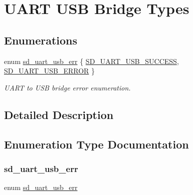 \hypertarget{group___s_d___u_a_r_t___u_s_b___bridge___types}{}\section{U\+A\+RT U\+SB Bridge Types}
\label{group___s_d___u_a_r_t___u_s_b___bridge___types}
\subsection*{Enumerations}
\begin{DoxyCompactItemize}
\item 
enum \mbox{\hyperlink{group___s_d___u_a_r_t___u_s_b___bridge___types_ga7e4773a8cce69fafe541cad55985f146}{sd\+\_\+uart\+\_\+usb\+\_\+err}} \{ \mbox{\hyperlink{group___s_d___u_a_r_t___u_s_b___bridge___types_gga7e4773a8cce69fafe541cad55985f146a5f1ee74f25f6a6f1aa6b771dc91abe11}{S\+D\+\_\+\+U\+A\+R\+T\+\_\+\+U\+S\+B\+\_\+\+S\+U\+C\+C\+E\+SS}}, 
\mbox{\hyperlink{group___s_d___u_a_r_t___u_s_b___bridge___types_gga7e4773a8cce69fafe541cad55985f146a5180e03b0462c07dd08871357b0030e5}{S\+D\+\_\+\+U\+A\+R\+T\+\_\+\+U\+S\+B\+\_\+\+E\+R\+R\+OR}}
 \}
\begin{DoxyCompactList}\small\item\em U\+A\+RT to U\+SB bridge error enumeration. \end{DoxyCompactList}\end{DoxyCompactItemize}


\subsection{Detailed Description}


\subsection{Enumeration Type Documentation}
\mbox{\label{group___s_d___u_a_r_t___u_s_b___bridge___types_ga7e4773a8cce69fafe541cad55985f146}} 
\subsubsection{\texorpdfstring{sd\+\_\+uart\+\_\+usb\+\_\+err}{sd\_uart\_usb\_err}}
{\footnotesize\ttfamily enum \mbox{\hyperlink{group___s_d___u_a_r_t___u_s_b___bridge___types_ga7e4773a8cce69fafe541cad55985f146}{sd\+\_\+uart\+\_\+usb\+\_\+err}}}



